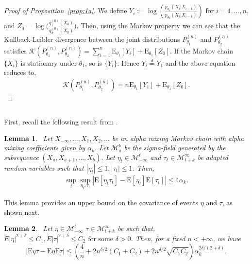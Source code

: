 \documentclass[11pt]{amsart}
\newcommand{\E}{\mathrm{E}}
\newcommand{\lowersigma}{\mathcal{M}_{-\infty}^{t}}
\newcommand{\uppersigma}{ \mathcal{M}_{t+k}^{\infty}}
\newtheorem{lemma}{Lemma}[section]
\begin{document}
\subsection{}
\begin{proof}[Proof of Proposition~\ref{prop:1a}]
We define $Y_i :=  \log\left(\frac{p_{\theta_1}(X_i|X_{i-1})}{p_{\theta_2}(X_i|X_{i-1})} \right)$ for $i = 1,\ldots,n$, and $Z_0=\log \bigg(\frac{q^{(0)}_{1}(X_0)}{q^{(0)}_2(X_0)}\bigg)$. Then, using the Markov property we can see that the Kullback-Leibler divergence between the joint distributions $P_{\theta_1}^{(n)}$ and $P_{\theta_2}^{(n)}$ satisfies
\(
  \mathcal{K}\left(P_{\theta_1}^{(n)},P_{\theta_2}^{(n)}\right) = \sum_{i=1}^n \E_{\theta_1} \left[ Y_i \right]+\E_{\theta_1}[Z_0].
\)
If the Markov chain $\{X_i\}$ is stationary under $\theta_1$, so is $\{Y_i\}$. Hence $Y_i\overset{d}{=}Y_1$ and the above equation reduces to, 
\begin{align}
    \mathcal{K}\left(P_{\theta_1}^{(n)},P_{\theta_2}^{(n)}\right) = n\E_{\theta_1} \left[ Y_1 \right]+\E_{\theta_1}[Z_0].
\end{align}
\end{proof}

\subsection{}
First, recall the following result from \cite{ibrag}.
\begin{lemma}{\cite[Lemma 1.2]{ibrag}}~\label{lem:alpha-mix}
Let $X_{-\infty},\dots,X_1,X_2,\dots$ be an alpha mixing Markov chain with alpha mixing coefficients given by $\alpha_k$. 
Let $\mathcal{M}_{a}^{b}$ be the sigma-field generated by the subsequence $(X_a,X_{a+1},\dots,X_b)$. Let $\eta_t\in \lowersigma$ and $\tau_t\in \uppersigma$ be adapted random variables such that $|\eta_t|\leq1,|\tau_t|\leq1$. Then,
\begin{align}
\underset{t}{\sup} \underset{\eta_t ,\tau_t}{\sup}|\E[\eta_t\tau_t]-\E[\eta_t] \E[\tau_t]|\leq 4\alpha_k.
\end{align}
\end{lemma}
This lemma provides an upper bound on the covariance of events $\eta \text{ and } \tau$, as shown next.

\begin{lemma}~\label{lem:corr-bound}
Let $\eta\in \lowersigma$ $\tau\in \uppersigma$ be such that, $E|\eta|^{2+\delta}\leq C_1,E|\tau|^{2+\delta}\leq C_2 \text{ for some } \delta>0$. Then, for a fixed $n < +\infty$, we have
\begin{equation}
 |\E\eta\tau-\E\eta \E\tau| \leq
    \left(\frac{4}{n} +
     2n^{\delta/2}(C_1+C_2)+
     2n^{\delta/2}\sqrt{C_1C_2}\right)\alpha_k^{2\delta/(2+\delta)}.
     \end{equation}
\end{lemma}
\end{document}
